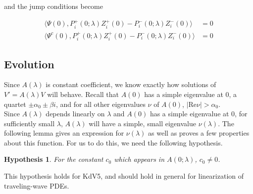 \documentclass[12pt]{article}
\newtheorem{hypothesis}{Hypothesis}
\begin{document}
and the jump conditions become

\begin{align*}
\langle \Psi(0), P_i^+(0; \lambda) Z_i^+(0) - P_i^-(0; \lambda) Z_i^-(0) \rangle &= 0 \\
\langle \Psi^c(0), P_i^+(0; \lambda) Z_i^+(0) - P_i^-(0; \lambda) Z_i^-(0) \rangle &= 0
\end{align*}

\subsection{Evolution}

Since $A(\lambda)$ is constant coefficient, we know exactly how solutions of $V' = A(\lambda)V$ will behave. Recall that $A(0)$ has a simple eigenvalue at 0, a quartet $\pm \alpha_0 \pm \beta i$, and for all other eigenvalues $\nu$ of $A(0)$, $|\text{Re} \nu| > \alpha_0$.\\

Since $A(\lambda)$ depends linearly on $\lambda$ and $A(0)$ has a simple eigenvalue at 0, for sufficiently small $\lambda$, $A(\lambda)$ will have a simple, small eigenvalue $\nu(\lambda)$. The following lemma gives an expression for $\nu(\lambda)$ as well as proves a few properties about this function. For us to do this, we need the following hypothesis.

\begin{hypothesis}\label{c0nonzero}
For the constant $c_0$ which appears in $A(0; \lambda)$, $c_0 \neq 0$.
\end{hypothesis}

This hypothesis holds for KdV5, and should hold in general for linearization of traveling-wave PDEs.

\end{document}
